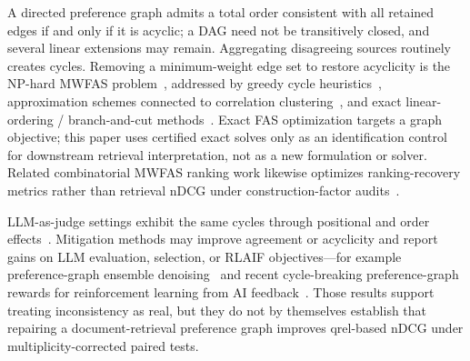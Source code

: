 \documentclass[pdflatex,sn-basic,Numbered]{sn-jnl}
\begin{document}
A directed preference graph admits a total order consistent with all
retained edges if and only if it is acyclic; a DAG need not be transitively
closed, and several linear extensions may remain. Aggregating disagreeing
sources routinely creates cycles. Removing a minimum-weight edge set to
restore acyclicity is the NP-hard MWFAS
problem~\cite{karp1972reducibility}, addressed by greedy cycle
heuristics~\cite{eades1993heuristic}, approximation schemes connected to
correlation clustering~\cite{kenyon2007fewerrors,ailon2008aggregating}, and
exact linear-ordering / branch-and-cut
methods~\cite{groetschel1984cutting,baharev2021exact}. Exact FAS
optimization targets a graph objective; this paper uses certified exact
solves only as an identification control for downstream retrieval
interpretation, not as a new formulation or solver. Related combinatorial
MWFAS ranking work likewise optimizes ranking-recovery metrics rather than
retrieval nDCG under construction-factor audits~\cite{vahidi2024mwfas}.

LLM-as-judge settings exhibit the same cycles through positional and order
effects~\cite{zheng2023judging,shi2025judging}. Mitigation methods may
improve agreement or acyclicity and report gains on LLM evaluation,
selection, or RLAIF objectives---for example preference-graph ensemble
denoising~\cite{hu2026acyclic} and recent cycle-breaking preference-graph
rewards for reinforcement learning from AI
feedback~\cite{liu2025votinggraph}. Those results support treating
inconsistency as real, but they do not by themselves establish that
repairing a document-retrieval preference graph improves qrel-based nDCG
under multiplicity-corrected paired tests.
\end{document}
